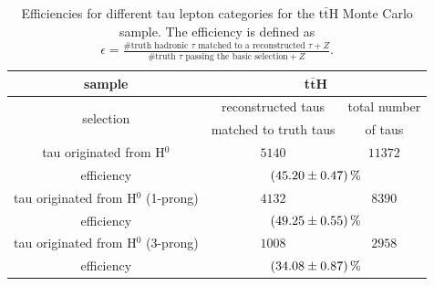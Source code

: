 \begin{table}[htbp]
		\centering
                \footnotesize
                \renewcommand{\arraystretch}{1.2}
		\begin{tabular*}{\linewidth}{@{\extracolsep{\fill}}ccc}
		\hline
                \hline
		\textbf{sample}    & \multicolumn{2}{c}{\textbf{t$\bar{\textbf{t}}$H}} 
		\\
		\hline
		\multirow{2}{*}{selection}   & reconstructed taus       & total number
               \\
              & matched to truth taus & of taus
		\\ 
		\hline
               tau originated from H$^0$        & $5140$          & $11372$
		\\
		efficiency                     & \multicolumn{2}{c}{$\SI{45.20\pm 0.47}{\percent}$}
		\\
		\hline
               tau originated from H$^0$ (1-prong)         & $4132$          & $8390$
		\\
		efficiency                     & \multicolumn{2}{c}{$\SI{49.25\pm 0.55}{\percent}$}
		\\
		\hline
                tau originated from H$^0$ (3-prong)         & $1008$          & $2958$
		\\
		efficiency                    & \multicolumn{2}{c}{$\SI{34.08\pm 0.87}{\percent}$}
		\\
		\hline
		\hline
		\end{tabular*}
		\caption[Efficiencies for the t$\bar{\text{t}}$H sample.]{Efficiencies for different tau lepton categories for the t$\bar{\text{t}}$H Monte Carlo sample. The efficiency is defined as $\epsilon=\frac{\text{\#truth hadronic }\tau\text{ matched to a reconstructed }\tau+Z}{\text{\#truth }\tau\text{ passing the basic selection}+Z}$.}
		\label{ttbarttHEffTable}
          \renewcommand{\arraystretch}{1}
\end{table}
%
%	
